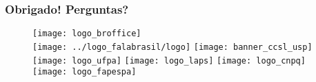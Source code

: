 \documentclass{beamer}
\begin{document}
\begin{frame}
   \large
   \frametitle{Obrigado! Perguntas?}
   \begin{figure}
      \texttt{[image: logo\_broffice]}\\
      \texttt{[image: ../logo\_falabrasil/logo]}
      \texttt{[image: banner\_ccsl\_usp]}\\
      \texttt{[image: logo\_ufpa]}
      \texttt{[image: logo\_laps]}
      \texttt{[image: logo\_cnpq]}
      \texttt{[image: logo\_fapespa]}
   \end{figure}
\end{frame}
\end{document}

